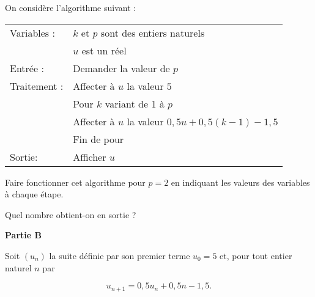 \documentclass[10pt]{article}
\begin{document}
\medskip

On considère l'algorithme suivant :

\begin{center}
\begin{tabularx}{0.8\linewidth}{|l|X|}\hline
Variables :	&$k$ et $p$ sont des entiers naturels\\
			&$u$ est un réel\\
Entrée :	& Demander la valeur de $p$\\
Traitement :& Affecter à $u$ la valeur $5$\\
			&\hspace{0.3mm}Pour $k$ variant de 1 à $p$\\
			&\hspace{0.6mm}Affecter à $u$ la valeur $0,5u + 0,5(k - 1) - 1,5$\\
			&\hspace{0.3mm}Fin de pour\\
Sortie:& Afficher $u$\\ \hline
\end{tabularx}
\end{center}

Faire fonctionner cet algorithme pour $p = 2$ en indiquant les valeurs des variables à chaque étape.

Quel nombre obtient-on en sortie ?

\bigskip

\textbf{Partie B}

\medskip

Soit $\left(u_n\right)$ la suite définie par son premier terme $u_0 = 5$ et, pour tout entier naturel $n$ par

\[u_{n+1} = 0,5u_n + 0,5n - 1,5.\]
\end{document}
